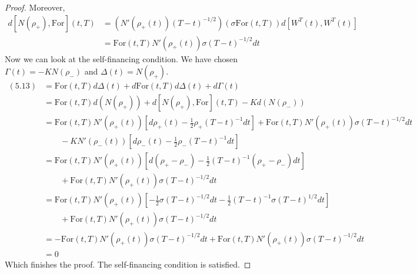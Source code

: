 \documentclass[a4paper, 10pt]{article}
\theoremstyle{definition}
\theoremstyle{hSol}
\begin{document}
\begin{proof}
Moreover,
\begin{equation}
  \begin{split}
    d[N(\rho_+), \text{For}](t,T) &=  \left(N'(\rho_{+}(t))(T-t)^{-1/2}\right) \left(\sigma\text{For}(t,T)\right)d[W^T(t), W^T(t)] \\
    &= \text{For}(t,T) N'(\rho_{+}(t)) \sigma (T-t)^{-1/2}dt
  \end{split}
\end{equation}
Now we can look at the self-financing condition. We have chosen $\Gamma(t)=-KN(\rho_-)$ and $\Delta(t)=N(\rho_+)$.
\begin{equation}
  \begin{split}
    (5.13) &= \text{For}(t,T)d\Delta(t) + d\text{For}(t,T)d\Delta(t) + d\Gamma(t) \\
    &=\text{For}(t,T)d(N(\rho_+)) + d[N(\rho_+), \text{For}](t,T) - Kd(N(\rho_-)) \\
    &= \text{For}(t,T)N'(\rho_{+}(t))\left[ d\rho_{+}(t) - \frac{1}{2}\rho_{+} (T-t)^{-1}dt\right] +  \text{For}(t,T) N'(\rho_{+}(t)) \sigma (T-t)^{-1/2}dt \\
    &\qquad - KN'(\rho_{-}(t))\left[ d\rho_{-}(t) - \frac{1}{2}\rho_{-} (T-t)^{-1}dt\right]\\
    &= \text{For}(t,T)N'(\rho_{+}(t))\left[ d(\rho_{+}-\rho_{-}) - \frac{1}{2} (T-t)^{-1}(\rho_{+}-\rho_{-})dt\right]\\
    &\qquad + \text{For}(t,T) N'(\rho_{+}(t)) \sigma (T-t)^{-1/2}dt\\
    &= \text{For}(t,T)N'(\rho_{+}(t))\left[ -\frac{1}{2}\sigma (T-t)^{-1/2}dt - \frac{1}{2} (T-t)^{-1}\sigma(T-t)^{1/2}dt\right]\\
    &\qquad + \text{For}(t,T) N'(\rho_{+}(t)) \sigma (T-t)^{-1/2}dt\\
    &= - \text{For}(t,T)N'(\rho_{+}(t))\sigma (T-t)^{-1/2}dt + \text{For}(t,T) N'(\rho_{+}(t)) \sigma (T-t)^{-1/2}dt\\
    & = 0
  \end{split}
\end{equation}
Which finishes the proof. The self-financing condition is satisfied.
\end{proof}
\end{document}
